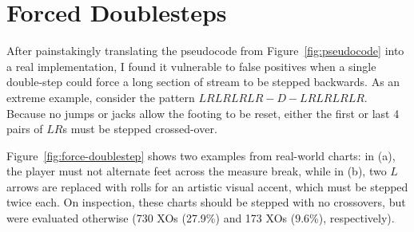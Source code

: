 \documentclass[10pt]{sigplanconf}
\begin{document}

\section{Forced Doublesteps}

After painstakingly translating the pseudocode from Figure~\ref{fig:pseudocode} into a real implementation,
I found it vulnerable to false positives when a single double-step could force a long section of stream to be stepped backwards.
As an extreme example, consider the pattern $LRLRLRLR-D-LRLRLRLR$.
Because no jumps or jacks allow the footing to be reset, either the first or last 4 pairs of $LR$s must be stepped crossed-over.

Figure~\ref{fig:force-doublestep} shows two examples from real-world charts:
in (a), the player must not alternate feet across the measure break,
while in (b), two $L$ arrows are replaced with rolls for an artistic visual accent, which must be stepped twice each.
On inspection, these charts should be stepped with no crossovers, but were evaluated otherwise %
(730 XOs (27.9\%) and 173 XOs (9.6\%), respectively).
\end{document}
